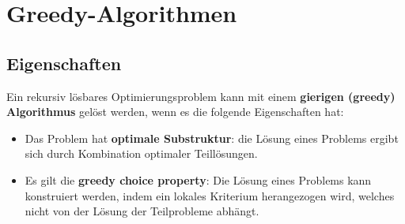 \section{Greedy-Algorithmen}
\begin{sectionbox}
\subsection{Eigenschaften}
Ein rekursiv lösbares Optimierungsproblem kann mit einem \textbf{gierigen (greedy) Algorithmus} gelöst werden, wenn es die folgende Eigenschaften hat:
\begin{itemize}
    \item Das Problem hat \textbf{optimale Substruktur}: die Lösung eines Problems ergibt sich durch Kombination optimaler Teillösungen.
    \item Es gilt die \textbf{greedy choice property}: Die Lösung eines Problems kann konstruiert werden, indem ein lokales Kriterium herangezogen wird, welches nicht von der Lösung der Teilprobleme abhängt.    
\end{itemize}
\end{sectionbox}
\vspace{-4pt}

